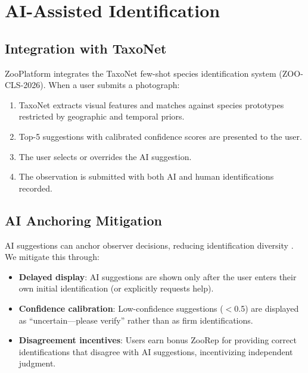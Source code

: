 \section{AI-Assisted Identification}

\label{sec:ai}

\subsection{Integration with TaxoNet}

ZooPlatform integrates the TaxoNet few-shot species identification
system (ZOO-CLS-2026). When a user submits a photograph:

\begin{enumerate}
  \item TaxoNet extracts visual features and matches against species
    prototypes restricted by geographic and temporal priors.
  \item Top-5 suggestions with calibrated confidence scores are
    presented to the user.
  \item The user selects or overrides the AI suggestion.
  \item The observation is submitted with both AI and human
    identifications recorded.
\end{enumerate}

\subsection{AI Anchoring Mitigation}

AI suggestions can anchor observer decisions, reducing identification
diversity \citep{terry2020think}. We mitigate this through:

\begin{itemize}
  \item \textbf{Delayed display}: AI suggestions are shown only after
    the user enters their own initial identification (or explicitly
    requests help).
  \item \textbf{Confidence calibration}: Low-confidence suggestions
    ($<$0.5) are displayed as ``uncertain---please verify'' rather than
    as firm identifications.
  \item \textbf{Disagreement incentives}: Users earn bonus ZooRep for
    providing correct identifications that disagree with AI suggestions,
    incentivizing independent judgment.
\end{itemize}

